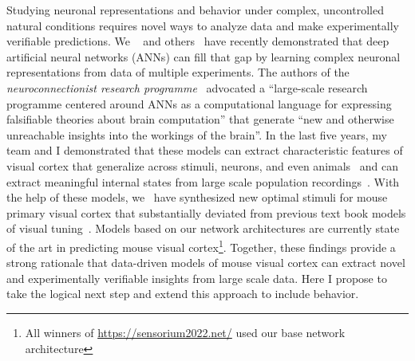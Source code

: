\documentclass[COG,11pt]{ercgrant}
\begin{document}
Studying neuronal representations and behavior under complex, uncontrolled natural conditions requires novel ways to analyze data and make experimentally verifiable predictions. 
We ~\parencite{Walker2019-yw, Cobos2022-rr, Franke2022-do} and others~\parencite{Bashivan2019-ry, Ponce2019-yn, Hofling2022-wr} have recently demonstrated that deep artificial neural networks (ANNs) can fill that gap by learning complex neuronal representations from data of multiple experiments.
The authors of the \textit{neuroconnectionist research programme}~\parencite{Doerig2022-ex} advocated a ``large-scale research programme centered around ANNs as a computational language for expressing falsifiable theories about brain computation'' that generate ``new and otherwise unreachable insights into the workings of the brain''. 
In the last five years, my team and I demonstrated that these models can extract characteristic features of visual cortex that generalize across stimuli, neurons, and even animals~\parencite{Sinz2018-sk,Lurz2020-ua,Cobos2022-rr} and can extract meaningful internal states from large scale population recordings~\parencite{Bashiri2021-or}. 
With the help of these models, we~\parencite{Walker2019-yw} have synthesized new optimal stimuli for mouse primary visual cortex that substantially deviated from previous text book models of visual tuning~\parencite{Hubel1959-zs}.
Models based on our network architectures are currently state of the art in predicting mouse visual cortex\footnote{All winners of  \url{https://sensorium2022.net/} used our base network architecture}. 
Together, these findings provide a strong rationale that data-driven models of mouse visual cortex can extract novel and experimentally verifiable insights from large scale data. 
Here I propose to take the logical next step and extend this approach to include behavior. 

\end{document}
